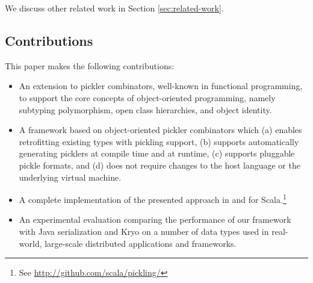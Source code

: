 \documentclass[10pt]{sigplanconf}
\theoremstyle{definition}
\theoremstyle{definition}
\begin{document}
We discuss other related work in Section \ref{sec:related-work}.

\subsection{Contributions}

This paper makes the following contributions:

\begin{itemize}

\item An extension to pickler combinators, well-known in functional
programming, to support the core concepts of object-oriented programming,
namely subtyping polymorphism, open class hierarchies, and object identity.

\item A framework based on object-oriented pickler combinators which (a)
enables retrofitting existing types with pickling support, (b) supports
automatically generating picklers at compile time and at runtime, (c) supports
pluggable pickle formats, and (d) does not require changes to the host
language or the underlying virtual machine.

\item A complete implementation of the presented approach in and for Scala.\footnote{See \url{http://github.com/scala/pickling/}}

\item An experimental evaluation comparing the performance of our framework
with Java serialization and Kryo on a number of data types used in real-world,
large-scale distributed applications and frameworks.

\end{itemize}







\end{document}
